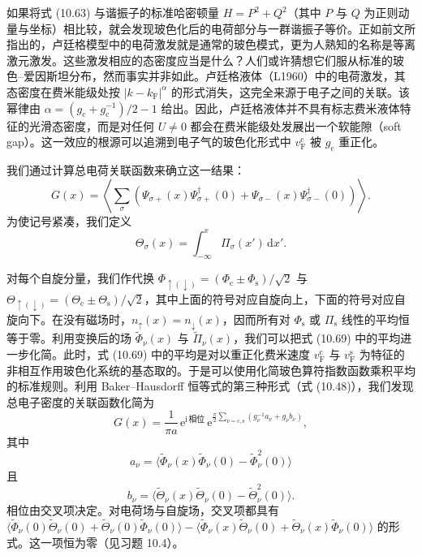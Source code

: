 如果将式 (10.63) 与谐振子的标准哈密顿量 $H=P^{2}+Q^{2}$（其中 $P$ 与 $Q$ 为正则动量与坐标）相比较，就会发现玻色化后的电荷部分与一群谐振子等价。正如前文所指出的，卢廷格模型中的电荷激发就是通常的玻色模式，更为人熟知的名称是等离激元激发。这些激发相应的态密度应当是什么？人们或许猜想它们服从标准的玻色–爱因斯坦分布，然而事实并非如此。卢廷格液体（L1960）中的电荷激发，其态密度在费米能级处按 $|k-k_{\mathrm{F}}|^{\alpha}$ 的形式消失，这完全来源于电子之间的关联。该幂律由 $\alpha=(g_{\mathrm{c}}+g_{\mathrm{c}}^{-1})/2-1$ 给出。因此，卢廷格液体并不具有标志费米液体特征的光滑态密度，而是对任何 $U\neq0$ 都会在费米能级处发展出一个软能隙（soft gap）。这一效应的根源可以追溯到电子气的玻色化形式中 $v_{\mathrm{F}}^{\mathrm{c}}$ 被 $g_{\mathrm{c}}$ 重正化。

我们通过计算总电荷关联函数来确立这一结果：
\begin{equation*}
G(x)=\left\langle\sum_{\sigma}\left(\Psi_{\sigma+}(x)\Psi_{\sigma+}^{\dagger}(0)+\Psi_{\sigma-}(x)\Psi_{\sigma-}^{\dagger}(0)\right)\right\rangle.
\tag{10.69}
\end{equation*}
为使记号紧凑，我们定义
\begin{equation*}
\Theta_{\sigma}(x)=\int_{-\infty}^{x}\Pi_{\sigma}(x')\,\mathrm{d}x'.
\tag{10.70}
\end{equation*}

对每个自旋分量，我们作代换 $\Phi_{\uparrow(\downarrow)}=(\Phi_{\mathrm{c}}\pm\Phi_{\mathrm{s}})/\sqrt{2}$ 与 $\Theta_{\uparrow(\downarrow)}=(\Theta_{\mathrm{c}}\pm\Theta_{\mathrm{s}})/\sqrt{2}$，其中上面的符号对应自旋向上，下面的符号对应自旋向下。在没有磁场时，$n_{\uparrow}(x)=n_{\downarrow}(x)$，因而所有对 $\Phi_{\mathrm{s}}$ 或 $\Pi_{\mathrm{s}}$ 线性的平均恒等于零。利用变换后的场 $\tilde{\Phi}_{\nu}(x)$ 与 $\tilde{\Pi}_{\nu}(x)$，我们可以把式 (10.69) 中的平均进一步化简。此时，式 (10.69) 中的平均是对以重正化费米速度 $v_{\mathrm{F}}^{\mathrm{c}}$ 与 $v_{\mathrm{F}}^{\mathrm{s}}$ 为特征的非相互作用玻色化系统的基态取的。于是可以使用化简玻色算符指数函数乘积平均的标准规则。利用 Baker–Hausdorff 恒等式的第三种形式（式 (10.48)），我们发现总电子密度的关联函数化简为
\begin{equation*}
G(x)=\frac{1}{\pi a}\,\mathrm{e}^{\mathrm{i}\,\text{相位}}\,\mathrm{e}^{\frac{\pi}{2}\sum_{\nu=\mathrm{c},\mathrm{s}}\left(g_{\nu}^{-1}a_{\nu}+g_{\nu}b_{\nu}\right)},
\tag{10.71}
\end{equation*}
其中
\begin{equation*}
a_{\nu}=\langle\tilde{\Phi}_{\nu}(x)\tilde{\Phi}_{\nu}(0)-\tilde{\Phi}_{\nu}^{2}(0)\rangle
\tag{10.72}
\end{equation*}
且
\begin{equation*}
b_{\nu}=\langle\tilde{\Theta}_{\nu}(x)\tilde{\Theta}_{\nu}(0)-\tilde{\Theta}_{\nu}^{2}(0)\rangle.
\tag{10.73}
\end{equation*}
相位由交叉项决定。对电荷场与自旋场，交叉项都具有 $\langle\tilde{\Phi}_{\nu}(0)\tilde{\Theta}_{\nu}(0)+\tilde{\Theta}_{\nu}(0)\tilde{\Phi}_{\nu}(0)\rangle-\langle\tilde{\Phi}_{\nu}(x)\tilde{\Theta}_{\nu}(0)+\tilde{\Theta}_{\nu}(x)\tilde{\Phi}_{\nu}(0)\rangle$ 的形式。这一项恒为零（见习题 10.4）。

